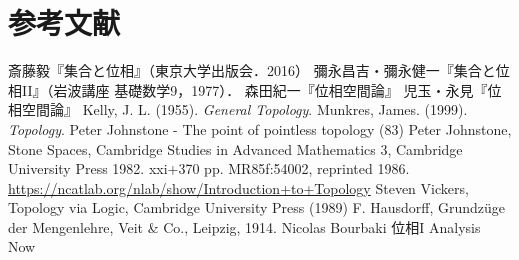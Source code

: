 \documentclass[uplatex,dvipdfmx]{jsreport}
\begin{document}
\chapter{参考文献}

\begin{thebibliography}{99}
    斎藤毅『集合と位相』（東京大学出版会．2016）
    彌永昌吉・彌永健一『集合と位相II』（岩波講座 基礎数学9，1977）．
    森田紀一『位相空間論』
    児玉・永見『位相空間論』
    Kelly, J. L. (1955). \textit{General Topology}.
    Munkres, James. (1999). \textit{Topology}.
        Peter Johnstone - The point of pointless topology (83)
        Peter Johnstone, Stone Spaces, Cambridge Studies in Advanced Mathematics 3, Cambridge University Press 1982. xxi+370 pp. MR85f:54002, reprinted 1986.
        \url{https://ncatlab.org/nlab/show/Introduction+to+Topology}
        Steven Vickers, Topology via Logic, Cambridge University Press (1989)
    F. Hausdorff, Grundzüge der Mengenlehre, Veit \& Co., Leipzig, 1914.
    Nicolas Bourbaki 位相I
    Analysis Now
\end{thebibliography}
\end{document}
